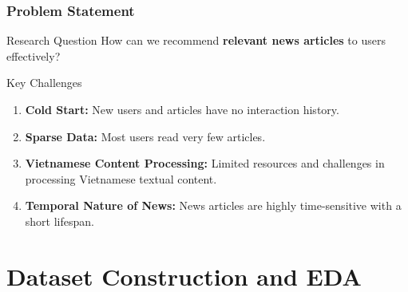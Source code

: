 \documentclass{beamer}
\begin{document}
\begin{frame}
    \frametitle{Problem Statement}

    \begin{block}{Research Question}
        How can we recommend \textbf{relevant news articles} to users effectively?
    \end{block}

    \vspace{0.3cm}
    \begin{block}{Key Challenges}
        \begin{enumerate}
            \item \textbf{Cold Start:} New users and articles have no interaction history.
            \item \textbf{Sparse Data:} Most users read very few articles.
            \item \textbf{Vietnamese Content Processing:} Limited resources and challenges in processing Vietnamese textual content.
            \item \textbf{Temporal Nature of News:} News articles are highly time-sensitive with a short lifespan.
        \end{enumerate}
    \end{block}
\end{frame}


\section{Dataset Construction and EDA}
\end{document}
